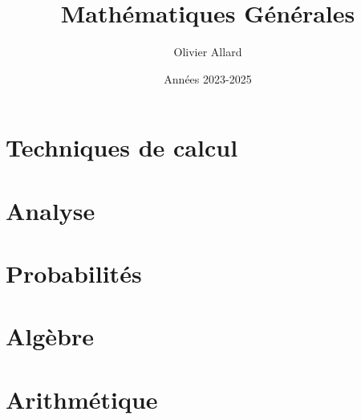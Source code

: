 \documentclass[12pt, a4paper, twoside]{report}
\author{Olivier Allard}
\title{Mathématiques Générales}
\date{Années 2023-2025}
\begin{document}




\tableofcontents

\part{Techniques de calcul}
    


\part{Analyse}
    






\part{Probabilités}
    


    
\part{Algèbre}
    



    
\part{Arithmétique}
    

    
\end{document}
